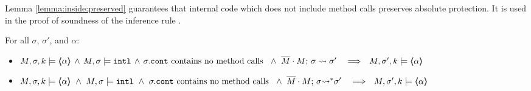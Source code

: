  

Lemma \ref{lemma:inside:preserved}  guarantees that internal code which does not include method calls preserves absolute protection. 
It is used in the proof of soundness of the inference rule {}.

  {
 \begin{lemma} For all $\sigma$, $\sigma'$, and $\alpha$:
 \label{lemma:inside:preserved} 
\begin{itemize}
\item
$ \satDAssertFrom M  {\sigma} k   {\inside{\alpha}}  \, \wedge \,M, \sigma \models \intThis \, \wedge \, \sigma.\prg{cont} \mbox{ contains no method calls } \ \wedge\ \leadstoBounded   {\Mtwo\cdot M}  {\sigma}  {\sigma'}\  \ \ \Longrightarrow\ \ \satDAssertFrom M  {\sigma'} k   {\inside{\alpha}}$
\item
$ \satDAssertFrom M  {\sigma} k   {\inside{\alpha}}  \ \wedge \ M, \sigma \models \intThis \ \wedge \ \sigma.\prg{cont}  \mbox{ contains no method calls } \ \wedge\ \leadstoBoundedStar  {\Mtwo\cdot M}  {\sigma}  {\sigma'}\  \ \ \Longrightarrow\ \ \satDAssertFrom M  {\sigma'} k   {\inside{\alpha}}$
\end{itemize}
\end{lemma}
}

